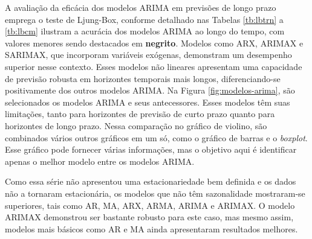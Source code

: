A avaliação da eficácia dos modelos ARIMA em previsões de longo prazo emprega o teste de Ljung-Box, conforme detalhado nas Tabelas \ref{tb:lbtrn} a \ref{tb:lbcm} ilustram a acurácia dos modelos ARIMA ao longo do tempo, com valores menores sendo destacados em \textbf{negrito}. Modelos como ARX, ARIMAX e SARIMAX, que incorporam variáveis exógenas, demonstram um desempenho superior nesse contexto. Esses modelos não lineares apresentam uma capacidade de previsão robusta em horizontes temporais mais longos, diferenciando-se positivamente dos outros modelos ARIMA. Na Figura \ref{fig:modelos-arima}, são selecionados os modelos ARIMA e seus antecessores. Esses modelos têm suas limitações, tanto para horizontes de previsão de curto prazo quanto para horizontes de longo prazo. Nessa comparação no gráfico de violino, são combinados vários outros gráficos em um só, como o gráfico de barras e o \textit{boxplot}. Esse gráfico pode fornecer várias informações, mas o objetivo aqui é identificar apenas o melhor modelo entre os modelos ARIMA.

Como essa série não apresentou uma estacionariedade bem definida e os dados não a tornaram estacionária, os modelos que não têm sazonalidade mostraram-se superiores, tais como AR, MA, ARX, ARMA, ARIMA e ARIMAX. O modelo ARIMAX demonstrou ser bastante robusto para este caso, mas mesmo assim, modelos mais básicos como AR e MA ainda apresentaram resultados melhores.

